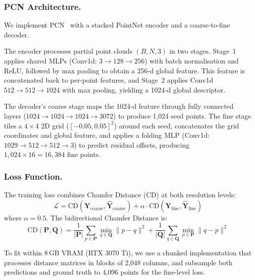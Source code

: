 \documentclass[runningheads]{llncs}
\begin{document}
\subsubsection{PCN Architecture.}
We implement PCN~\cite{yuan2019pcnpointcompletionnetwork} with a stacked PointNet encoder and a coarse-to-fine decoder.

The encoder processes partial point clouds $(B, N, 3)$ in two stages. Stage~1 applies shared MLPs (Conv1d: $3 \to 128 \to 256$) with batch normalisation and ReLU, followed by max pooling to obtain a 256-d global feature. This feature is concatenated back to per-point features, and Stage~2 applies Conv1d $512 \to 512 \to 1024$ with max pooling, yielding a 1024-d global descriptor.

The decoder's coarse stage maps the 1024-d feature through fully connected layers ($1024 \to 1024 \to 1024 \to 3072$) to produce 1{,}024 seed points. The fine stage tiles a $4 \times 4$ 2D grid ($[-0.05, 0.05]^2$) around each seed, concatenates the grid coordinates and global feature, and applies a folding MLP (Conv1d: $1029 \to 512 \to 512 \to 3$) to predict residual offsets, producing $1{,}024 \times 16 = 16{,}384$ fine points.

\subsubsection{Loss Function.}
The training loss combines Chamfer Distance (CD) at both resolution levels:
\begin{equation}
\mathcal{L} = \text{CD}(\mathbf{Y}_{\text{coarse}}, \hat{\mathbf{Y}}_{\text{coarse}}) + \alpha \cdot \text{CD}(\mathbf{Y}_{\text{fine}}, \hat{\mathbf{Y}}_{\text{fine}})
\end{equation}
where $\alpha = 0.5$. The bidirectional Chamfer Distance is:
\begin{equation}
\text{CD}(\mathbf{P}, \mathbf{Q}) = \frac{1}{|\mathbf{P}|}\sum_{p \in \mathbf{P}} \min_{q \in \mathbf{Q}} \|p - q\|^2 + \frac{1}{|\mathbf{Q}|}\sum_{q \in \mathbf{Q}} \min_{p \in \mathbf{P}} \|q - p\|^2
\end{equation}

To fit within 8\,GB VRAM (RTX 3070 Ti), we use a chunked implementation that processes distance matrices in blocks of 2{,}048 columns, and subsample both predictions and ground truth to 4{,}096 points for the fine-level loss.
\end{document}
